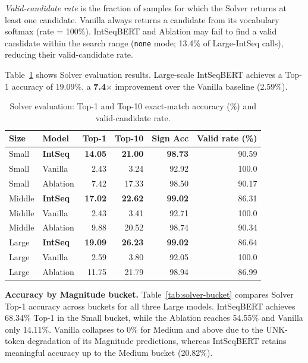 \emph{Valid-candidate rate} is the fraction of samples for which the Solver returns at least
one candidate. Vanilla always returns a candidate from its vocabulary softmax (rate = 100\%).
IntSeqBERT and Ablation may fail to find a valid candidate within the search range
(\texttt{none} mode; 13.4\% of Large-IntSeq calls), reducing their valid-candidate rate.

Table~\ref{tab:solver-eval} shows Solver evaluation results. Large-scale IntSeqBERT achieves
a Top-1 accuracy of 19.09\%, a \textbf{7.4$\times$} improvement over the Vanilla
baseline (2.59\%).

\begin{table}[t]
\caption{Solver evaluation: Top-1 and Top-10 exact-match accuracy (\%) and valid-candidate rate.}
\label{tab:solver-eval}
\centering
\begin{tabular}{llrrrr}
\hline
Size   & Model           & Top-1          & Top-10         & Sign Acc       & Valid rate (\%) \\
\hline
Small  & \textbf{IntSeq} & \textbf{14.05} & \textbf{21.00} & \textbf{98.73} & 90.59 \\
Small  & Vanilla         & 2.43           & 3.24           & 92.92          & 100.0 \\
Small  & Ablation        & 7.42           & 17.33          & 98.50          & 90.17 \\
Middle & \textbf{IntSeq} & \textbf{17.02} & \textbf{22.62} & \textbf{99.02} & 86.31 \\
Middle & Vanilla         & 2.43           & 3.41           & 92.71          & 100.0 \\
Middle & Ablation        & 9.88           & 20.52          & 98.74          & 90.34 \\
Large  & \textbf{IntSeq} & \textbf{19.09} & \textbf{26.23} & \textbf{99.02} & 86.64 \\
Large  & Vanilla         & 2.59           & 3.80           & 92.05          & 100.0 \\
Large  & Ablation        & 11.75          & 21.79          & 98.94          & 86.99 \\
\hline
\end{tabular}
\end{table}

\textbf{Accuracy by Magnitude bucket.} Table~\ref{tab:solver-bucket} compares Solver
Top-1 accuracy across buckets for all three Large models. IntSeqBERT achieves 68.34\%
Top-1 in the Small bucket, while the Ablation reaches 54.55\% and Vanilla only 14.11\%.
Vanilla collapses to 0\% for Medium and above due to the UNK-token degradation of its
Magnitude predictions, whereas IntSeqBERT retains meaningful accuracy up to the Medium
bucket (20.82\%).

